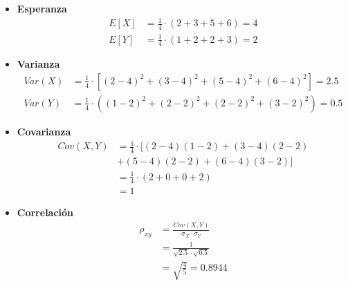 \documentclass[../main.tex]{subfiles}
\begin{document}
\begin{example}
            \begin{itemize}
                \item \textbf{Esperanza}
                    \begin{equation}
                        \begin{split}
                            E[X] &= \frac{1}{4} \cdot (2 + 3 + 5 + 6) = 4
                            \\E[Y] &= \frac{1}{4} \cdot (1 + 2 + 2 + 3) = 2
                        \end{split}
                    \end{equation}
                \item \textbf{Varianza}
                    \begin{equation}
                        \begin{split}
                            Var(X) &= \frac{1}{4} \cdot [(2 - 4)^2 + (3 - 4)^2 + (5 - 4)^2 + (6 - 4)^2] = 2.5
                            \\Var(Y) &= \frac{1}{4} \cdot ((1 - 2)^2 + (2 - 2)^2 + (2 - 2)^2 + (3 - 2)^2) = 0.5
                        \end{split}
                    \end{equation}
                \item \textbf{Covarianza}
                    \begin{equation}
                        \begin{split}
                            Cov(X,Y) &= \frac{1}{4} \cdot [(2 - 4)(1 - 2) + (3 - 4)(2 - 2) \\
                            &+ (5 - 4)(2 - 2) + (6 - 4)(3 - 2)] \\
                            &= \frac{1}{4} \cdot (2 + 0 + 0 + 2) \\
                            &= 1
                        \end{split}
                    \end{equation}
                
                \item \textbf{Correlación}
                    \begin{equation}
                        \begin{split}
                            \rho_{xy} &= \frac{Cov(X,Y)}{\sigma_X \cdot \sigma_Y} \\
                            &= \frac{1}{\sqrt{2.5} \cdot \sqrt{0.5}} \\
                            &= \sqrt{\frac{4}{5}} = 0.8944
                        \end{split}
                    \end{equation}
            \end{itemize}
        \end{example}


        
\end{document}
